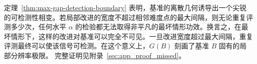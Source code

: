 定理~\ref{thm:max-gap-detection-boundary} 表明，基准的离散几何诱导出一个尖锐的可检测性相变。若局部改进的宽度不超过相邻难度点的最大间隔，则无论重复评测多少次，任何水平 $\alpha$ 的检验都无法取得非平凡的最坏情形功效。换言之，在最坏情形下，这样的改进对基准可以完全不可见。一旦改进宽度超过最大间隔，重复评测最终可以使该信号可检测。在这个意义上，$G(B)$ 刻画了基准 $B$ 固有的局部分辨率极限。
完整证明见附录~\ref{sec:app_proof_missed}。
